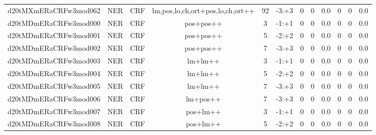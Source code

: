 \documentclass[a4paper]{article}
\begin{document}
\begin{landscape}
\begin{center}
\begin{tabular}{ |c|c|c|c|c|c|c|c|c|c|c|c|}
 
 	
 	\small{ d20tMXmERaCRFw3mod062 } & \small{ NER} & \small{  CRF }  & lm,pos,lo,ch,ort+pos,lo,ch,ort++  &  92 &  \small{  -3:+3 }  &  0 & 0 & 0.0  &  0 & 0 & 0.0 \\
 	

 
 	
 	\small{ d20tMDmERaCRFw3mod000 } & \small{ NER} & \small{  CRF }  & pos+pos++  &  3 &  \small{  -1:+1 }  &  0 & 0 & 0.0  &  0 & 0 & 0.0 \\
 	

 
 	
 	\small{ d20tMDmERaCRFw3mod001 } & \small{ NER} & \small{  CRF }  & pos+pos++  &  5 &  \small{  -2:+2 }  &  0 & 0 & 0.0  &  0 & 0 & 0.0 \\
 	

 
 	
 	\small{ d20tMDmERaCRFw3mod002 } & \small{ NER} & \small{  CRF }  & pos+pos++  &  7 &  \small{  -3:+3 }  &  0 & 0 & 0.0  &  0 & 0 & 0.0 \\
 	

 
 	
 	\small{ d20tMDmERaCRFw3mod003 } & \small{ NER} & \small{  CRF }  & lm+lm++  &  3 &  \small{  -1:+1 }  &  0 & 0 & 0.0  &  0 & 0 & 0.0 \\
 	

 
 	
 	\small{ d20tMDmERaCRFw3mod004 } & \small{ NER} & \small{  CRF }  & lm+lm++  &  5 &  \small{  -2:+2 }  &  0 & 0 & 0.0  &  0 & 0 & 0.0 \\
 	

 
 	
 	\small{ d20tMDmERaCRFw3mod005 } & \small{ NER} & \small{  CRF }  & lm+lm++  &  7 &  \small{  -3:+3 }  &  0 & 0 & 0.0  &  0 & 0 & 0.0 \\
 	

 
 	
 	\small{ d20tMDmERaCRFw3mod006 } & \small{ NER} & \small{  CRF }  & lm+pos++  &  7 &  \small{  -3:+3 }  &  0 & 0 & 0.0  &  0 & 0 & 0.0 \\
 	

 
 	
 	\small{ d20tMDmERaCRFw3mod007 } & \small{ NER} & \small{  CRF }  & pos+lm++  &  3 &  \small{  -1:+1 }  &  0 & 0 & 0.0  &  0 & 0 & 0.0 \\
 	

 
 	
 	\small{ d20tMDmERaCRFw3mod008 } & \small{ NER} & \small{  CRF }  & pos+lm++  &  5 &  \small{  -2:+2 }  &  0 & 0 & 0.0  &  0 & 0 & 0.0 \\
 	


\end{tabular}
\end{center}
\end{landscape}
\end{document}
